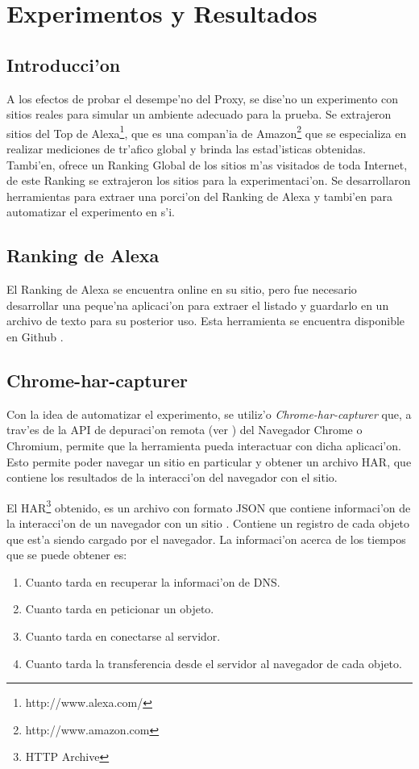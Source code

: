 \chapter{Experimentos y Resultados}
\label{experimentacion}
\section{Introducci'on}

A los efectos de probar el desempe'no del Proxy, se dise'no un experimento con sitios reales para simular un ambiente adecuado para la prueba. Se extrajeron sitios del Top de Alexa\footnote{http://www.alexa.com/}, que es una compan'ia de Amazon\footnote{http://www.amazon.com} que se especializa en realizar mediciones de tr'afico global y brinda las estad'isticas obtenidas. Tambi'en, ofrece un Ranking Global de los sitios m'as visitados de toda Internet, de este Ranking se extrajeron los sitios para la experimentaci'on. Se desarrollaron herramientas para extraer una porci'on del Ranking de Alexa y tambi'en para automatizar el experimento en s'i.

\section{Ranking de Alexa}
\label{rankingalexa}
El Ranking de Alexa se encuentra online en su sitio, pero fue necesario desarrollar una peque'na aplicaci'on para extraer el listado y guardarlo en un archivo de texto para su posterior uso. Esta herramienta se encuentra disponible en Github \citep{alexatop}.

\section{Chrome-har-capturer}

Con la idea de automatizar el experimento, se utiliz'o \emph{Chrome-har-capturer} \citep{harcapturer} que, a trav'es de la API de depuraci'on remota (ver \citep{debugger}) del Navegador Chrome o Chromium, permite que la herramienta pueda interactuar con dicha aplicaci'on. Esto permite  poder navegar un sitio en particular y obtener un archivo HAR, que contiene los resultados de la interacci'on del navegador con el sitio.

El HAR\footnote{HTTP Archive} obtenido, es un archivo con formato JSON que contiene informaci'on de la interacci'on de un navegador con un sitio \citep{harSpec}. Contiene un registro de cada objeto que est'a siendo cargado por el navegador. La informaci'on acerca de los tiempos que se puede obtener es:
\begin{enumerate}
\item Cuanto tarda en recuperar la informaci'on de DNS.
\item Cuanto tarda en peticionar un objeto.
\item Cuanto tarda en conectarse al servidor.
\item Cuanto tarda la transferencia desde el servidor al navegador de cada objeto.
\end{enumerate}

